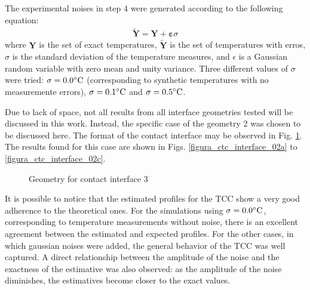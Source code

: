 \documentclass[conference,compsoc,fleqn]{IEEEtran}
\begin{document}
The experimental noises in step 4 were generated according to the following equation:
\begin{align}
\tilde{\mathbf{Y}} = \mathbf{Y} + \mathbf{\varepsilon} \sigma \label{modelagem_erro}
\end{align}
where $\mathbf{Y}$ is the set of exact temperatures, $\tilde{\mathbf{Y}}$ is the set of temperatures with erros, $\sigma$ is the standard deviation of the temperature measures, and $\epsilon$ is a Gaussian random variable with zero mean and unity variance. Three different values of $\sigma$ were tried: $\sigma = \text{0.0}\celsius$ (corresponding to synthetic temperatures with no measuremente errors), $\sigma = \text{0.1}\celsius$ and $\sigma = \text{0.5}\celsius$.

Due to lack of space, not all results from all interface geometries tested will be discussed in this work. Instead, the specific case of the geometry 2 was chosen to be discussed here. The format of the contact interface may be observed in Fig. \ref{fig3}. The results found for this case are shown in Figs. \ref{figura_ctc_interface_02a} to \ref{figura_ctc_interface_02c}.
\begin{figure}[H]
	\begin{center}
		\caption{Geometry for contact interface 3}
		\label{fig3}
	\end{center}
\end{figure}
It is possible to notice that the estimated profiles for the TCC show a very good adherence to the theoretical ones. For the simulations using $\sigma = \text{0.0}\celsius$, corresponding to temperature measurements without noise, there is an excellent agreement between the estimated and expected profiles. For the other cases, in which gaussian noises were added, the general behavior of the TCC was well captured. A direct relationship between the amplitude of the noise and the exactness of the estimative was also observed: as the amplitude of the noise diminishes, the estimatives become closer to the exact values.
\end{document}
